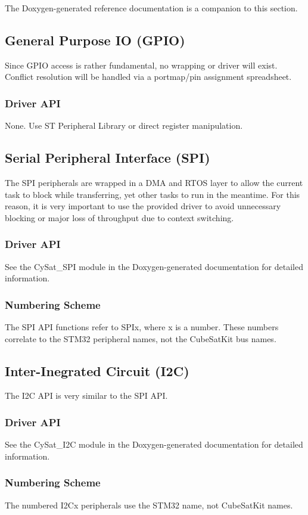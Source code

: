 \documentclass{article}
\begin{document}
The Doxygen-generated reference documentation is a companion to this section.

\subsection{General Purpose IO (GPIO)}
Since GPIO access is rather fundamental, no wrapping or driver will exist. Conflict
resolution will be handled via a portmap/pin assignment spreadsheet.
\subsubsection{Driver API}
None. Use ST Peripheral Library or direct register manipulation.

\subsection{Serial Peripheral Interface (SPI)}
The SPI peripherals are wrapped in a DMA and RTOS layer to allow the current
task to block while transferring, yet other tasks to run in the meantime.
For this reason, it is very important to use the provided driver to avoid
unnecessary blocking or major loss of throughput due to context switching.
\subsubsection{Driver API}
See the CySat\_SPI module in the Doxygen-generated documentation for detailed
information.
\subsubsection{Numbering Scheme}
The SPI API functions refer to SPIx, where x is a number. These numbers
correlate to the STM32 peripheral names, not the CubeSatKit bus names.

\subsection{Inter-Inegrated Circuit (I2C)}
The I2C API is very similar to the SPI API.
\subsubsection{Driver API}
See the CySat\_I2C module in the Doxygen-generated documentation for detailed
information.
\subsubsection{Numbering Scheme}
The numbered I2Cx peripherals use the STM32 name, not CubeSatKit names.
\end{document}
